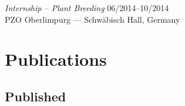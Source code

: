 \documentclass[margin]{res}
\begin{document}
\begin{resume}


{\sl Internship -- Plant Breeding} \hfill 06/2014--10/2014 \\
PZO Oberlimpurg  --- Schwäbisch Hall, Germany


 
\section{Publications} %


\subsection{Published}
\begin{etaremune}
\setlength\itemsep{0ex}


\end{etaremune}
\end{resume}
\end{document}

